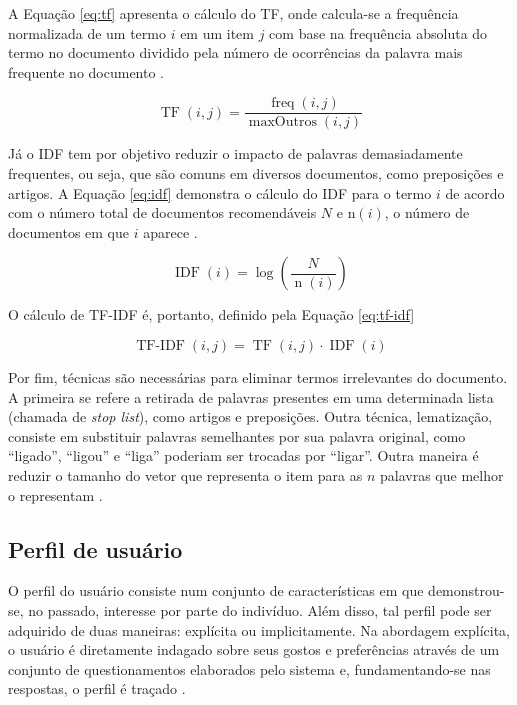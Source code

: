     A Equação \ref{eq:tf} apresenta o cálculo do TF, onde calcula-se a frequência normalizada de um termo $i$ em um item $j$ com base na frequência absoluta do termo no documento dividido pela número de ocorrências da palavra mais frequente no documento \cite{Jannach2010}.
     
    \begin{equation}
        \operatorname{TF}(i,j) = \frac{\operatorname{freq}(i,j)}{\operatorname{maxOutros}(i,j)} \label{eq:tf}
    \end{equation}
    
    Já o IDF tem por objetivo reduzir o impacto de palavras demasiadamente frequentes, ou seja, que são comuns em diversos documentos, como preposições e artigos. A Equação \ref{eq:idf} demonstra o cálculo do IDF para o termo $i$ de acordo com o número total de documentos recomendáveis $N$ e $\mathrm{n}(i)$, o número de documentos em que $i$ aparece \cite{Jannach2010}.
    
    \begin{equation}
        \operatorname{IDF}(i) = \log\left(\frac{N}{\operatorname{n}(i)}\right) \label{eq:idf}
    \end{equation}
        
    O cálculo de TF-IDF é, portanto, definido pela Equação \ref{eq:tf-idf}
    
    \begin{equation}
        \operatorname{TF-IDF}(i,j) = \operatorname{TF}(i, j)\cdot \operatorname{IDF}(i) \label{eq:tf-idf}
    \end{equation}

    
    Por fim, técnicas são necessárias para eliminar termos irrelevantes do documento. A primeira se refere a retirada de palavras presentes em uma determinada lista (chamada de \textit{stop list}), como artigos e preposições. Outra técnica, lematização, consiste em substituir palavras semelhantes por sua palavra original, como ``ligado'', ``ligou'' e ``liga'' poderiam ser trocadas por ``ligar''. Outra maneira é reduzir o tamanho do vetor que representa o item para as $n$ palavras que melhor o representam \cite{Jannach2010}.
    
     
    \subsection{Perfil de usuário}
    
    O perfil do usuário consiste num conjunto de características em que demonstrou-se, no passado, interesse por parte do indivíduo. Além disso, tal perfil pode ser adquirido de duas maneiras: explícita ou implicitamente. Na abordagem explícita, o usuário é diretamente indagado sobre seus gostos e preferências através de um conjunto de questionamentos elaborados pelo sistema e, fundamentando-se nas respostas, o perfil é traçado \cite{Adomavicius2005}.
    
